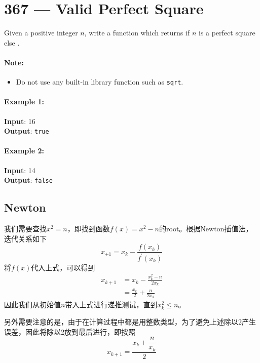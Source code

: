 \section{367 --- Valid Perfect Square}
Given a positive integer $ n $, write a function which returns  if $ n $ is a perfect square else .

\paragraph{Note:} 
\begin{itemize}
\item Do not use any built-in library function such as \texttt{sqrt}.
\end{itemize}

\paragraph{Example 1:}

\begin{flushleft}
\textbf{Input}: 16
\\
\textbf{Output}: \texttt{true}
\end{flushleft}

\paragraph{Example 2:}

\begin{flushleft}
\textbf{Input}: 14
\\
\textbf{Output}: \texttt{false}
\end{flushleft}

\subsection{Newton}
我们需要查找$x^2=n$，即找到函数$f(x)=x^2-n$的root。根据Newton插值法，迭代关系如下
\[
x_{+1} = x_k - \frac{f(x_k)}{f^{'}(x_k)}
\]
将$f(x)$代入上式，可以得到
\begin{align*}
x_{k+1} &= x_k - \frac{x_{k}^2-n}{2x_k}\\
&=\frac{x_k}{2} + \frac{n}{2x_k}
\end{align*}
因此我们从初始值$n$带入上式进行递推测试，直到$x_k^2\leq n$。
\par
另外需要注意的是，由于在计算过程中都是用整数类型，为了避免上述除以2产生误差，因此将除以2放到最后进行，即按照
\[
x_{k+1} = \dfrac{x_k + \dfrac{n}{x_k}}{2}
\]

